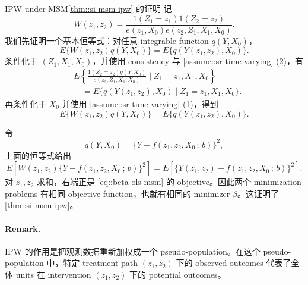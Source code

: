 \begin{exercisesolution}{IPW under MSM}{\cref{thm::si-msm-ipw} 的证明}
记
\[
W(z_1,z_2)
=
\frac{1(Z_1=z_1)1(Z_2=z_2)}
{e(z_1,X_0)e(z_2,Z_1,X_1,X_0)}.
\]
我们先证明一个基本恒等式：对任意 integrable function $q(Y,X_0)$，
\[
E\{W(z_1,z_2)q(Y,X_0)\}
=
E\{q(Y(z_1,z_2),X_0)\}.
\]
条件化于 $(Z_1,X_1,X_0)$，并使用 consistency 与 \cref{assume::sr-time-varying} (2)，有
\begin{align*}
&E\left\{
\frac{1(Z_2=z_2)q(Y,X_0)}
{e(z_2,Z_1,X_1,X_0)}
\mid Z_1=z_1,X_1,X_0
\right\}\\
&\quad =
E\{q(Y(z_1,z_2),X_0)\mid Z_1=z_1,X_1,X_0\}.
\end{align*}
再条件化于 $X_0$ 并使用 \cref{assume::sr-time-varying} (1)，得到
\[
E\{W(z_1,z_2)q(Y,X_0)\}
=E\{q(Y(z_1,z_2),X_0)\}.
\]

令
\[
q(Y,X_0)=\{Y-f(z_1,z_2,X_0\,;\,b)\}^2,
\]
上面的恒等式给出
\[
E\left[W(z_1,z_2)\{Y-f(z_1,z_2,X_0\,;\,b)\}^2\right]
=
E\left[\{Y(z_1,z_2)-f(z_1,z_2,X_0\,;\,b)\}^2\right].
\]
对 $z_1,z_2$ 求和，右端正是 \cref{eq::beta-ols-msm} 的 objective。因此两个 minimization problems 有相同 objective function，也就有相同的 minimizer $\beta$。这证明了 \cref{thm::si-msm-ipw}。

\paragraph{Remark.}
IPW 的作用是把观测数据重新加权成一个 pseudo-population。在这个 pseudo-population 中，特定 treatment path $(z_1,z_2)$ 下的 observed outcomes 代表了全体 units 在 intervention $(z_1,z_2)$ 下的 potential outcomes。
\end{exercisesolution}

